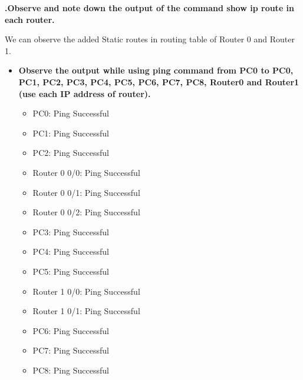 \documentclass[a4paper,11pt]{article}
\begin{document}
\begin{enumerate}
            \textbf{.Observe and note down the output of the command show ip route in each router.}

            We can observe the added Static routes  in routing table of Router 0 and Router 1.


            \begin{itemize}
                  \item \textbf{Observe the output while using ping command from PC0 to PC0, PC1, PC2, PC3, PC4, PC5, PC6,
                              PC7, PC8, Router0 and Router1 (use each IP address of router).}
                        \begin{itemize}
                              \item PC0: Ping Successful
                              \item PC1: Ping Successful
                              \item PC2: Ping Successful
                              \item Router 0 0/0: Ping Successful
                              \item Router 0 0/1: Ping Successful
                              \item Router 0 0/2: Ping Successful
                              \item PC3: Ping Successful
                              \item PC4: Ping Successful
                              \item PC5: Ping Successful
                              \item Router 1 0/0: Ping Successful
                              \item Router 1 0/1: Ping Successful
                              \item PC6: Ping Successful
                              \item PC7: Ping Successful
                              \item PC8: Ping Successful
                        \end{itemize}


\end{itemize}
\end{enumerate}
\end{document}
